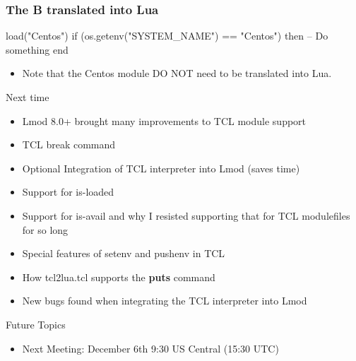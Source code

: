 \documentclass{beamer}
\begin{document}
\begin{frame}[fragile]
    \frametitle{The \textbf{B} translated into Lua}
 {\tiny
    \begin{semiverbatim}
   load("Centos")
   if (os.getenv("SYSTEM\_NAME") == "Centos") then
     -- Do something
   end
    \end{semiverbatim}
}
  \begin{itemize}
    \item Note that the Centos module DO NOT need to be translated
      into Lua.
  \end{itemize}

\end{frame}

\begin{frame}{Next time}
  \begin{itemize}
    \item Lmod 8.0+ brought many improvements to TCL module support
    \item TCL break command
    \item Optional Integration of TCL interpreter into Lmod (saves
      time)
    \item Support for is-loaded 
    \item Support for is-avail and why I resisted supporting that for
      TCL modulefiles for so long
    \item Special features of setenv and pushenv in TCL
    \item How tcl2lua.tcl supports the \textbf{puts} command
    \item New bugs found when integrating the TCL interpreter into Lmod
  \end{itemize}
\end{frame}



\begin{frame}{Future Topics}
  \begin{itemize}
    \item Next Meeting: December 6th 9:30 US Central (15:30 UTC)
  \end{itemize}
\end{frame}
\end{document}
